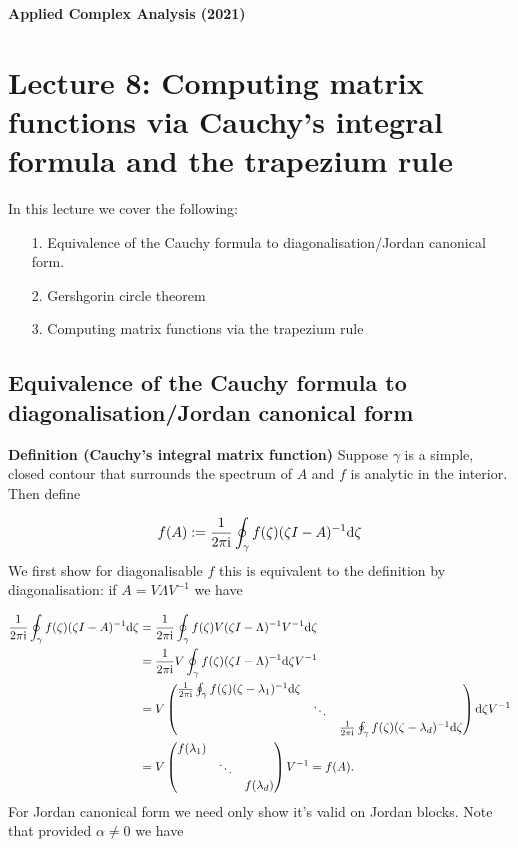 \documentclass[12pt,landscape]{article}
\def\D{ {\rm d} }
\def\I{ {\rm i} }
\def\sopmatrix#1{ \begin{pmatrix}#1\end{pmatrix} }
\begin{document}
{\LARGE
\sf
\textbf{Applied Complex Analysis (2021)}

\section{Lecture 8: Computing matrix  functions via Cauchy's integral formula and the trapezium rule}
In this lecture we cover the following:

\begin{itemize}
\item[1. ] Equivalence of the Cauchy formula to diagonalisation/Jordan canonical form.


\item[2. ] Gershgorin circle theorem


\item[3. ] Computing matrix functions via the trapezium rule

\end{itemize}
\newpage
\subsection{Equivalence of the Cauchy formula to diagonalisation/Jordan canonical form}
\textbf{Definition (Cauchy's integral  matrix function)} Suppose $\gamma$ is a simple, closed contour that surrounds the spectrum of $A$ and $f$ is analytic in the interior. Then define

\[
f(A) := {1 \over 2 \pi \I} \oint_\gamma f(\zeta)(\zeta I - A)^{-1} \D \zeta
\]
\newpage
We first show for diagonalisable $f$ this is equivalent to the definition by diagonalisation: if $A = V \Lambda V^{-1}$ we have


\begin{align*}
{1 \over 2 \pi \I} \oint_\gamma f(\zeta)(\zeta I - A)^{-1} \D \zeta &=
{1 \over 2 \pi \I} \oint_\gamma f(\zeta) V (\zeta I - \Lambda)^{-1} V^{-1} \D \zeta \\
&= {1 \over 2 \pi \I}  V \oint_\gamma f(\zeta)  (\zeta I - \Lambda)^{-1}  \D \zeta V^{-1}\\
&=  V \sopmatrix{ {1 \over 2 \pi \I} \oint_\gamma f(\zeta)  (\zeta - \lambda_1)^{-1} \D \zeta\\
&\ddots \\ && {1 \over 2 \pi \I} \oint_\gamma f(\zeta)  (\zeta - \lambda_d)^{-1} \D \zeta }  \D \zeta V^{-1} \\
&= V \sopmatrix{ f(\lambda_1)\\
&\ddots \\ && f(\lambda_d) }   V^{-1}  = f(A).
\end{align*}
\newpage
For Jordan canonical form we need only show it's valid on Jordan blocks. Note that provided $\alpha \neq 0$ we have

}
\end{document}
